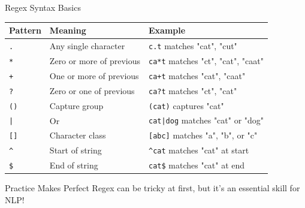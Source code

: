 \documentclass[aspectratio=169]{beamer}
\begin{document}
\begin{frame}{Regex Syntax Basics 📝}
\begin{center}
\begin{tabular}{lll}
\toprule
\textbf{Pattern} & \textbf{Meaning} & \textbf{Example} \\
\midrule
\texttt{.} & Any single character & \texttt{c.t} matches "cat", "cut" \\
\texttt{*} & Zero or more of previous & \texttt{ca*t} matches "ct", "cat", "caat" \\
\texttt{+} & One or more of previous & \texttt{ca+t} matches "cat", "caat" \\
\texttt{?} & Zero or one of previous & \texttt{ca?t} matches "ct", "cat" \\
\texttt{()} & Capture group & \texttt{(cat)} captures "cat" \\
\texttt{|} & Or & \texttt{cat|dog} matches "cat" or "dog" \\
\texttt{[]} & Character class & \texttt{[abc]} matches "a", "b", or "c" \\
\texttt{\^{}} & Start of string & \texttt{\^{}cat} matches "cat" at start \\
\texttt{\$} & End of string & \texttt{cat\$} matches "cat" at end \\
\bottomrule
\end{tabular}
\end{center}

\vspace{0.3cm}

\begin{alertblock}{Practice Makes Perfect}
Regex can be tricky at first, but it's an essential skill for NLP!
\end{alertblock}
\end{frame}
\end{document}
